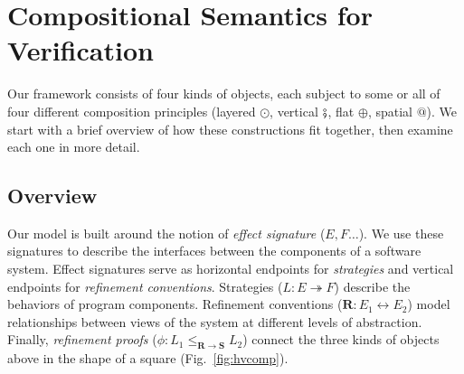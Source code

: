 \documentclass[acmsmall,nonacm]{acmart}
\begin{document}


\section{Compositional Semantics for Verification} \label{sec:overview} %

Our framework consists of four kinds of objects,
each subject to some or all of four
different composition principles
(layered $\odot$,
 vertical $\fatsemi$,
 flat $\oplus$,
 spatial $\mathbin@$).
We start with a brief overview of how these constructions fit together,
then examine each one in more detail.

\subsection{Overview} %


Our model is built around the notion of \emph{effect signature} ($E, F\ldots$).
We use these signatures to describe the
interfaces between the components of a software system.
Effect signatures serve
as horizontal endpoints for \emph{strategies}
and vertical endpoints for \emph{refinement conventions}.
Strategies
($L : E \twoheadrightarrow F$)
describe the behaviors of program components.
Refinement conventions
($\mathbf{R} : E_1 \leftrightarrow E_2$)
model relationships between
views of the system at different levels of abstraction.
Finally,
\emph{refinement proofs}
($\phi : L_1 \le_{\mathbf{R} \rightarrow \mathbf{S}} L_2$)
connect the three kinds of objects above
in the shape of a square (Fig.~\ref{fig:hvcomp}).

\end{document}
